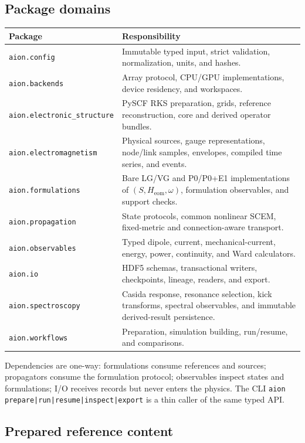 \documentclass[11pt]{article}
\newcommand{\hH}{H_{\mathrm{eom}}}
\newcommand{\code}[1]{\texttt{#1}}
\begin{document}
\subsection{Package domains}

\begin{longtable}{@{}p{}p{}@{}}
\toprule
Package & Responsibility\\
\midrule
\endhead
\code{aion.config} &
Immutable typed input, strict validation, normalization, units, and hashes.\\
\code{aion.backends} &
Array protocol, CPU/GPU implementations, device residency, and workspaces.\\
\code{aion.electronic\_structure} &
PySCF RKS preparation, grids, reference reconstruction, core and derived
operator bundles.\\
\code{aion.electromagnetism} &
Physical sources, gauge representations, node/link samples, envelopes,
compiled time series, and events.\\
\code{aion.formulations} &
Bare LG/VG and P0/P0+E1 implementations of
\((S,\hH,\omega)\), formulation observables, and support checks.\\
\code{aion.propagation} &
State protocols, common nonlinear SCEM, fixed-metric and connection-aware
transport.\\
\code{aion.observables} &
Typed dipole, current, mechanical-current, energy, power, continuity, and Ward
calculators.\\
\code{aion.io} &
HDF5 schemas, transactional writers, checkpoints, lineage, readers, and
export.\\
\code{aion.spectroscopy} &
Casida response, resonance selection, kick transforms, spectral observables,
and immutable derived-result persistence.\\
\code{aion.workflows} &
Preparation, simulation building, run/resume, and comparisons.\\
\bottomrule
\end{longtable}

Dependencies are one-way: formulations consume references and sources;
propagators consume the formulation protocol; observables inspect states and
formulations; I/O receives records but never enters the physics. The CLI
\code{aion prepare|run|resume|inspect|export} is a thin caller of the same
typed API.

\subsection{Prepared reference content}
\end{document}
